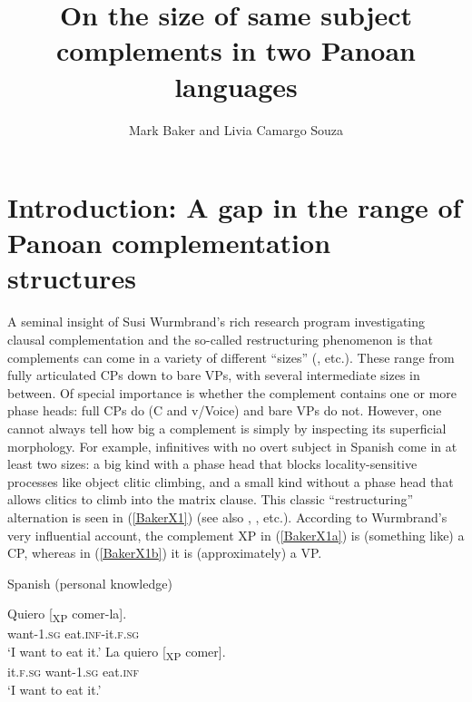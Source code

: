 \documentclass[output=paper]{langscibook}
\author{Mark Baker\affiliation{Rutgers University} and Livia Camargo Souza\affiliation{Rutgers University}}
\title{On the size of same subject complements in two Panoan languages}
\begin{document}
\renewcommand{\sc}[1]{\textsc{#1}}
\maketitle

\section{Introduction: A gap in the range of Panoan complementation structures}\label{sec:baker:1}
\begin{sloppypar}
A seminal insight of Susi Wurmbrand’s rich research program investigating clausal complementation and the so-called restructuring phenomenon is that complements can come in a variety of different “sizes” (\citealt{wurmbrand2001infinitives}, etc.). These range from fully articulated CPs down to bare VPs, with several intermediate sizes in between. Of special importance is whether the complement contains one or more phase heads: full CPs do (C and v/Voice) and bare VPs do not. However, one cannot always tell how big a complement is simply by inspecting its superficial morphology. For example, infinitives with no overt subject in Spanish come in at least two sizes: a big kind with a phase head that blocks locality-sensitive processes like object clitic climbing, and a small kind without a phase head that allows clitics to climb into the matrix clause. This classic “restructuring” alternation is seen in (\ref{BakerX1}) (see also \citealt{rizzi1982issues}, \citealt{burzio1986italian}, etc.). According to Wurmbrand’s very influential account, the complement XP in (\ref{BakerX1a}) is (something like) a CP, whereas in (\ref{BakerX1b}) it is (approximately) a VP.
\end{sloppypar}

\begin{exe}
    \ex Spanish (personal knowledge)\label{BakerX1}
	    \begin{xlist}
			\ex \label{BakerX1a}
			\gll Quiero [\textsubscript{XP }comer-la].\\
			        want-1.\sc{sg} eat.\sc{inf}-it.\sc{f.sg}\\
			    \glt `I want to eat it.'
			\ex \label{BakerX1b}
			\gll La quiero [\textsubscript{XP }comer].\\
			        it.\sc{f.sg} want-1.\sc{sg} eat.\sc{inf}\\
			    \glt `I want to eat it.'
		\end{xlist}
\end{exe}
\end{document}
